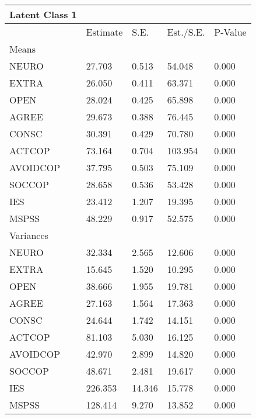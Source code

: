 \documentclass[
  man]{apa7}
\begin{document}
\begin{longtable}[]{@{}lllll@{}}
\toprule\noalign{}
Latent Class 1 & & & & \\
\midrule\noalign{}
\endhead
\bottomrule\noalign{}
\endlastfoot
& Estimate & S.E. & Est./S.E. & P-Value \\
Means & & & & \\
NEURO & 27.703 & 0.513 & 54.048 & 0.000 \\
EXTRA & 26.050 & 0.411 & 63.371 & 0.000 \\
OPEN & 28.024 & 0.425 & 65.898 & 0.000 \\
AGREE & 29.673 & 0.388 & 76.445 & 0.000 \\
CONSC & 30.391 & 0.429 & 70.780 & 0.000 \\
ACTCOP & 73.164 & 0.704 & 103.954 & 0.000 \\
AVOIDCOP & 37.795 & 0.503 & 75.109 & 0.000 \\
SOCCOP & 28.658 & 0.536 & 53.428 & 0.000 \\
IES & 23.412 & 1.207 & 19.395 & 0.000 \\
MSPSS & 48.229 & 0.917 & 52.575 & 0.000 \\
Variances & & & & \\
NEURO & 32.334 & 2.565 & 12.606 & 0.000 \\
EXTRA & 15.645 & 1.520 & 10.295 & 0.000 \\
OPEN & 38.666 & 1.955 & 19.781 & 0.000 \\
AGREE & 27.163 & 1.564 & 17.363 & 0.000 \\
CONSC & 24.644 & 1.742 & 14.151 & 0.000 \\
ACTCOP & 81.103 & 5.030 & 16.125 & 0.000 \\
AVOIDCOP & 42.970 & 2.899 & 14.820 & 0.000 \\
SOCCOP & 48.671 & 2.481 & 19.617 & 0.000 \\
IES & 226.353 & 14.346 & 15.778 & 0.000 \\
MSPSS & 128.414 & 9.270 & 13.852 & 0.000 \\
\end{longtable}
\end{document}
